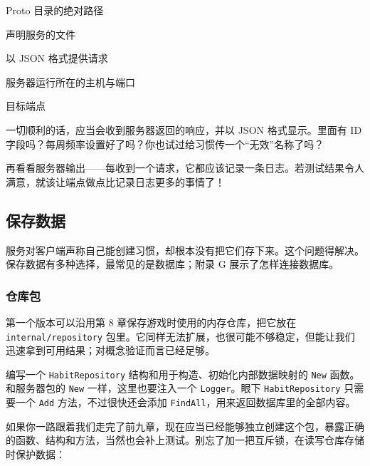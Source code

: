
\begin{codeannotations}
\item Proto 目录的绝对路径
\item 声明服务的文件
\item 以 JSON 格式提供请求
\item 服务器运行所在的主机与端口
\item 目标端点
\end{codeannotations}

一切顺利的话，应当会收到服务器返回的响应，并以 JSON 格式显示。里面有 ID 字段吗？每周频率设置好了吗？你也试过给习惯传一个“无效”名称了吗？

再看看服务器输出——每收到一个请求，它都应该记录一条日志。若测试结果令人满意，就该让端点做点比记录日志更多的事情了！

\subsection{保存数据}

服务对客户端声称自己能创建习惯，却根本没有把它们存下来。这个问题得解决。保存数据有多种选择，最常见的是数据库；附录 G 展示了怎样连接数据库。

\subsubsection{仓库包}

第一个版本可以沿用第 8 章保存游戏时使用的内存仓库，把它放在 \texttt{internal/repository} 包里。它同样无法扩展，也很可能不够稳定，但能让我们迅速拿到可用结果；对概念验证而言已经足够。

编写一个 \texttt{HabitRepository} 结构和用于构造、初始化内部数据映射的 \texttt{New} 函数。和服务器包的 \texttt{New} 一样，这里也要注入一个 \texttt{Logger}。眼下 \texttt{HabitRepository} 只需要一个 \texttt{Add} 方法，不过很快还会添加 \texttt{FindAll}，用来返回数据库里的全部内容。

如果你一路跟着我们走完了前九章，现在应当已经能够独立创建这个包，暴露正确的函数、结构和方法，当然也会补上测试。别忘了加一把互斥锁，在读写仓库存储时保护数据：

